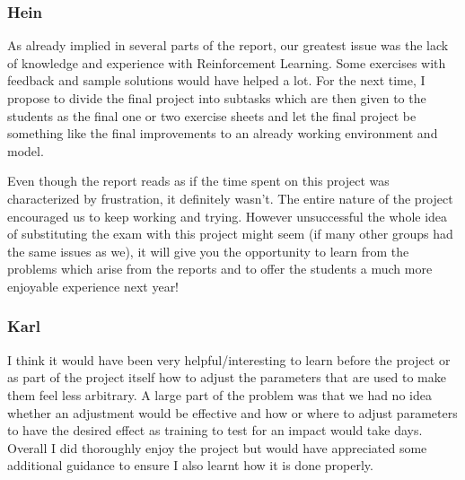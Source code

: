 \subsubsection{Hein}
As already implied in several parts of the report, our greatest issue was the lack of knowledge and experience with Reinforcement Learning. Some exercises with feedback and sample solutions would have helped a lot. For the next time, I propose to divide the final project into subtasks which are then given to the students as the final one or two exercise sheets and let the final project be something like the final improvements to an already working environment and model.\par
Even though the report reads as if the time spent on this project was characterized by frustration, it definitely wasn't. The entire nature of the project encouraged us to keep working and trying. However unsuccessful the whole idea of substituting the exam with this project might seem (if many other groups had the same issues as we), it will give you the opportunity to learn from the problems which arise from the reports and to offer the students a much more enjoyable experience next year!
\subsubsection{Karl}
I think it would have been very helpful/interesting to learn before the project or as part of the project itself how to adjust the parameters that are used to make them feel less arbitrary. A large part of the problem was that we had no idea whether an adjustment would be effective and how or where to adjust parameters to have the desired effect as training to test for an impact would take days. Overall I did thoroughly enjoy the project but would have appreciated some additional guidance to ensure I also learnt how it is done properly.